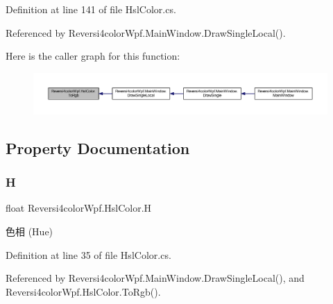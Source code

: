 Definition at line 141 of file Hsl\+Color.\+cs.



Referenced by Reversi4color\+Wpf.\+Main\+Window.\+Draw\+Single\+Local().

Here is the caller graph for this function\+:
\nopagebreak
\begin{figure}[H]
\begin{center}
\leavevmode
\includegraphics[width=350pt]{class_reversi4color_wpf_1_1_hsl_color_a7b0fd43bbad55f9f383cceeda28e9103_icgraph}
\end{center}
\end{figure}


\subsection{Property Documentation}
\mbox{\label{class_reversi4color_wpf_1_1_hsl_color_a0dcab06abe9e65d4966271c908f9c7e9}} 
\subsubsection{\texorpdfstring{H}{H}}
{\footnotesize\ttfamily float Reversi4color\+Wpf.\+Hsl\+Color.\+H\hspace{0.3cm}{\ttfamily [get]}}



色相 (Hue) 



Definition at line 35 of file Hsl\+Color.\+cs.



Referenced by Reversi4color\+Wpf.\+Main\+Window.\+Draw\+Single\+Local(), and Reversi4color\+Wpf.\+Hsl\+Color.\+To\+Rgb().

\mbox{\label{class_reversi4color_wpf_1_1_hsl_color_a0438ecdd010e619e945f496660c0375d}} 
